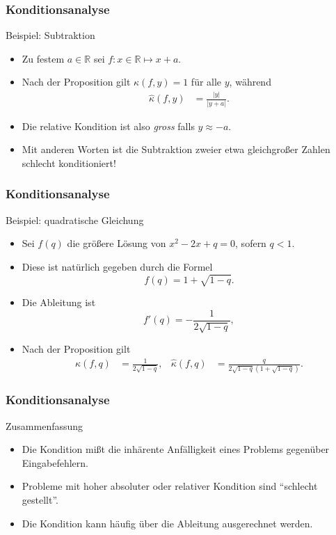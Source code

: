 \documentclass{beamer}
\renewcommand{\emph}[1]{{\textcolor{solarizedRed}{\itshape #1}}}
\newcommand\RR{\mathbb R}
\renewcommand{\ae}{\"a}
\newcommand{\ue}{\"u}
\newcommand{\mytitle}{Konditionsanalyse}
\begin{document}
\begin{frame}\frametitle{\mytitle}
	\begin{block}{Beispiel: Subtraktion}
		\begin{itemize}
			\item Zu festem $a\in\RR$ sei $f:x\in\RR\mapsto x+a$.
			\item Nach der Proposition gilt $\kappa(f,y)=1$ f\"ur alle $y$, w\"ahrend
				\begin{align*}
					\hat\kappa(f,y)&=\frac{|y|}{|y+a|}.
				\end{align*}
			\item  Die relative Kondition ist also \emph{gross} falls $y\approx-a$.
			\item Mit anderen Worten ist die Subtraktion zweier etwa gleichgro\ss er Zahlen \alert{schlecht konditioniert}!
		\end{itemize}
	\end{block}
\end{frame}

\begin{frame}\frametitle{\mytitle}
	\begin{block}{Beispiel: quadratische Gleichung}
		\begin{itemize}
			\item Sei $f(q)$ die gr\"o\ss ere L\"osung von $x^2-2x+q=0$, sofern $q<1$.
			\item 
				Diese ist nat\"urlich gegeben durch die Formel
				$$f(q)=1+\sqrt{1-q}.$$
			\item 
				Die Ableitung ist
				$$f'(q)=-\frac1{2\sqrt{1-q}},$$
			\item Nach der Proposition gilt
				\begin{align*}
					\kappa(f,q)&=\frac1{2\sqrt{1-q}},&
					\hat\kappa(f,q)&=\frac{q}{2\sqrt{1-q}(1+\sqrt{1-q})}.
				\end{align*}
		\end{itemize}		
	\end{block}
\end{frame}

\begin{frame}\frametitle{\mytitle}
	\begin{block}{Zusammenfassung}
		\begin{itemize}
			\item Die Kondition mi\ss t die inh\ae rente Anf\ae lligkeit eines Problems gegen\ue ber Eingabefehlern.
			\item Probleme mit hoher absoluter oder relativer Kondition sind \alert{``schlecht gestellt''}.
			\item Die Kondition kann h\"aufig \"uber die Ableitung ausgerechnet werden.
		\end{itemize}
	\end{block}
\end{frame}
\end{document}
